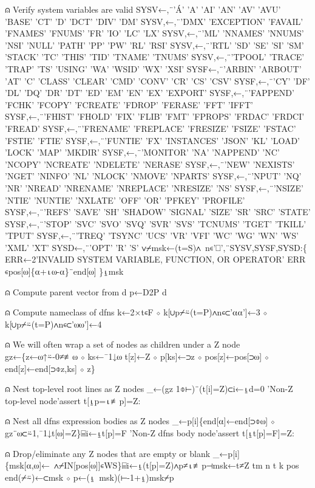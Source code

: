 \documentclass{article}%
\begin{document}
⍝ Verify system variables are valid
         SYSV←,¨'Á' 'A' 'AI' 'AN' 'AV' 'AVU' 'BASE' 'CT' 'D' 'DCT' 'DIV' 'DM'
         SYSV,←,¨'DMX' 'EXCEPTION' 'FAVAIL' 'FNAMES' 'FNUMS' 'FR' 'IO' 'LC' 'LX'
         SYSV,←,¨'ML' 'NNAMES' 'NNUMS' 'NSI' 'NULL' 'PATH' 'PP' 'PW' 'RL' 'RSI'
         SYSV,←,¨'RTL' 'SD' 'SE' 'SI' 'SM' 'STACK' 'TC' 'THIS' 'TID' 'TNAME' 'TNUMS'
         SYSV,←,¨'TPOOL' 'TRACE' 'TRAP' 'TS' 'USING' 'WA' 'WSID' 'WX' 'XSI'
         SYSF←,¨'ARBIN' 'ARBOUT' 'AT' 'C' 'CLASS' 'CLEAR' 'CMD' 'CONV' 'CR' 'CS' 'CSV'
         SYSF,←,¨'CY' 'DF' 'DL' 'DQ' 'DR' 'DT' 'ED' 'EM' 'EN' 'EX' 'EXPORT'
         SYSF,←,¨'FAPPEND' 'FCHK' 'FCOPY' 'FCREATE' 'FDROP' 'FERASE' 'FFT' 'IFFT'
         SYSF,←,¨'FHIST' 'FHOLD' 'FIX' 'FLIB' 'FMT' 'FPROPS' 'FRDAC' 'FRDCI' 'FREAD'
         SYSF,←,¨'FRENAME' 'FREPLACE' 'FRESIZE' 'FSIZE' 'FSTAC' 'FSTIE' 'FTIE'
         SYSF,←,¨'FUNTIE' 'FX' 'INSTANCES' 'JSON' 'KL' 'LOAD' 'LOCK' 'MAP' 'MKDIR'
         SYSF,←,¨'MONITOR' 'NA' 'NAPPEND' 'NC' 'NCOPY' 'NCREATE' 'NDELETE' 'NERASE'
         SYSF,←,¨'NEW' 'NEXISTS' 'NGET' 'NINFO' 'NL' 'NLOCK' 'NMOVE' 'NPARTS'
         SYSF,←,¨'NPUT' 'NQ' 'NR' 'NREAD' 'NRENAME' 'NREPLACE' 'NRESIZE' 'NS'
         SYSF,←,¨'NSIZE' 'NTIE' 'NUNTIE' 'NXLATE' 'OFF' 'OR' 'PFKEY' 'PROFILE'
         SYSF,←,¨'REFS' 'SAVE' 'SH' 'SHADOW' 'SIGNAL' 'SIZE' 'SR' 'SRC' 'STATE'
         SYSF,←,¨'STOP' 'SVC' 'SVO' 'SVQ' 'SVR' 'SVS' 'TCNUMS' 'TGET' 'TKILL' 'TPUT'
         SYSF,←,¨'TREQ' 'TSYNC' 'UCS' 'VR' 'VFI' 'WC' 'WG' 'WN' 'WS' 'XML' 'XT'
         SYSD←,¨'OPT' 'R' 'S'
         ∨⌿msk←(t=S)∧~n∊'⎕',¨SYSV,SYSF,SYSD:\{
                 ERR←2'INVALID SYSTEM VARIABLE, FUNCTION, OR OPERATOR'
                 ERR ∊pos[⍵]\{⍺+⍳⍵-⍺\}¨end[⍵]
         \}⍸msk

⍝ Compute parent vector from d
         p←D2P d

⍝ Compute nameclass of dfns
         k←2×t∊F ⋄ k[∪p⌿⍨(t=P)∧n∊⊂'⍺⍺']←3 ⋄ k[∪p⌿⍨(t=P)∧n∊⊂'⍵⍵']←4

⍝ We will often wrap a set of nodes as children under a Z node
         gz←\{z←⍵↑⍨-0≠≢⍵ ⋄ ks←¯1↓⍵
                 t[z]←Z ⋄ p[ks]←⊃z ⋄ pos[z]←pos[⊃⍵] ⋄ end[z]←end[⊃⌽z,ks] ⋄ z\}

⍝ Nest top-level root lines as Z nodes
         _←(gz 1⌽⊢)¨(t[i]=Z)⊂i←⍸d=0
         'Non-Z top-level node'assert t[⍸p=⍳≢p]=Z:

⍝ Nest all dfns expression bodies as Z nodes
         _←p[i]\{end[⍺]←end[⊃⌽⍵] ⋄ gz¨⍵⊂⍨1,¯1↓t[⍵]=Z\}⌸i←⍸t[p]=F
         'Non-Z dfns body node'assert t[⍸t[p]=F]=Z:

⍝ Drop/eliminate any Z nodes that are empty or blank
         _←p[i]\{msk[⍺,⍵]←~∧⌿IN[pos[⍵]]∊WS\}⌸i←⍸(t[p]=Z)∧p≠⍳≢p⊣msk←t≠Z
         tm n t k pos end(⌿⍨)←⊂msk ⋄ p←(⍸~msk)(⊢-1+⍸)msk⌿p
\end{document}
